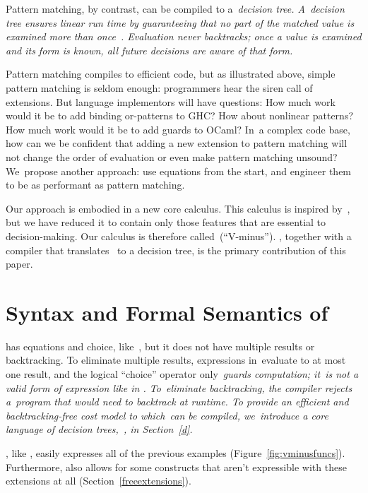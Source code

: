 \documentclass[runningheads]{llncs}
\begin{document}
Pattern matching, by contrast, can be compiled to a~\it{decision tree}.
A~decision tree ensures linear run time by guaranteeing that no part of
the matched value is examined more than once~\cite{maranget}. %
Evaluation never backtracks;
once a value is examined and its form is known,
all future decisions are aware of that form.

Pattern matching compiles to efficient code,
but as illustrated above, 
simple pattern matching is seldom enough:
programmers hear the siren call of extensions.
But language implementors will have questions:
How much work would it be to add binding or-patterns to GHC? %
How about nonlinear patterns? %
How much work would it be to add guards to OCaml? %
In~a complex code base, how can we be confident that 
adding a new extension to pattern matching will not change the order
of evaluation or even make pattern matching unsound? %
We~propose another approach: use equations from the start, and engineer them to be
as performant as pattern matching.

Our approach is embodied in a new core calculus.
This calculus is 
 inspired by~\VC, 
but we have reduced it to contain only those features
that are essential to
decision-making.
Our calculus is therefore called~\VMinus (``V-minus''). %
\VMinus, together with a compiler that translates \VMinus\ to a
decision tree, is the primary contribution of this paper.



\section{Syntax and Formal Semantics of~\VMinus}
\label{vminus}
\VMinus has equations and choice, like~\VC, but it does not have multiple
results or backtracking. %
To eliminate multiple results, expressions in~\VMinus evaluate to at most one
result, and the logical ``choice'' operator only~\it{guards} computation; it~is
not a valid form of expression like in \VC. %
To~eliminate backtracking, the compiler rejects a~\VMinus program
that would need to backtrack at runtime. %
To provide an efficient and
backtracking-free cost model to which~\VMinus can be compiled, we~introduce
a core language of decision trees,~\D, in Section~\ref{d}. %

\VMinus, like \VC, easily expresses all of the previous examples
(Figure~\ref{fig:vminusfuncs}). %
Furthermore, \VMinus also allows for some constructs that aren't expressible
with these extensions at all (Section~\ref{freeextensions}).
\end{document}
